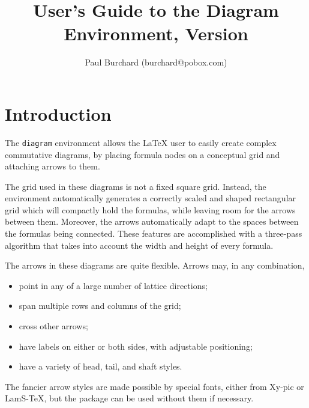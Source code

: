 \documentclass[12pt]{article}\usepackage{pb-diagram}
\title{User's Guide to the Diagram Environment,
   Version \diagramversion}
\author{Paul Burchard (burchard@pobox.com)}
\begin{document}
\maketitle

\section{Introduction}

The \verb"diagram" environment allows the
\ifx\fmtname\tooee\LaTeXe\else\LaTeX\fi{} user to easily
create complex commutative diagrams, by placing formula nodes
on a conceptual grid and attaching arrows to them.

The grid used in these diagrams is not a fixed square grid.
Instead, the environment automatically generates a correctly scaled
and shaped rectangular grid which will compactly hold the formulas,
while leaving room for the arrows between them.  Moreover, the
arrows automatically adapt to the spaces between the formulas
being connected.  These features are accomplished with a
three-pass algorithm that takes into account the width
and height of every formula.

The arrows in these diagrams are quite flexible.
Arrows may, in any combination,
\begin{itemize}
 \item point in any of a large number of lattice directions;
 \item span multiple rows and columns of the grid;
 \item cross other arrows;
 \item have labels on either or both sides,
    with adjustable positioning;
 \item have a variety of head, tail, and shaft styles.
\end{itemize}
The fancier arrow styles are made possible by special fonts,
either from Xy-pic or {\sc LamS}-\TeX, but the package can be used
without them if necessary.
\end{document}
